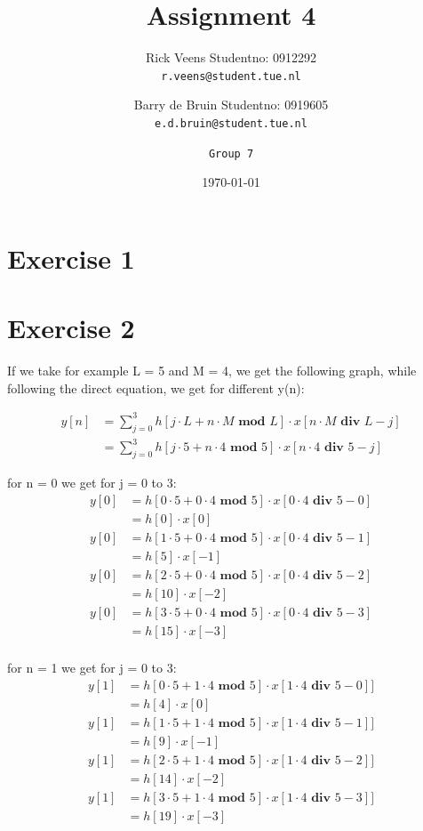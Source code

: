 \documentclass[a4paper,twoside,11pt, fleqn]{article}
\title{\vspace{-\baselineskip}\sffamily\bfseries Assignment 4}
\author{
	Rick Veens \qquad Studentno: 0912292\\
	\texttt{r.veens@student.tue.nl}
	\and
	Barry de Bruin \qquad Studentno: 0919605\\
	\texttt{e.d.bruin@student.tue.nl}
	\and
	\texttt{Group 7}
}
\date{\today}
\begin{document}
\maketitle
\newpage

\tableofcontents

\newpage

\section{Exercise 1}
\section{Exercise 2}
If we take for example L = 5 and M = 4, we get the following graph, while following the direct equation, we get for different y(n):

\begin{align}
y[n] &= \sum_{j=0}^3 h[j\cdot L + n\cdot M \textbf{ mod } L]\cdot x[n\cdot M \textbf{ div } L - j]\\
&= \sum_{j=0}^3 h[j\cdot 5 + n\cdot 4 \textbf{ mod } 5]\cdot x[n\cdot 4 \textbf{ div } 5 - j]
\end{align}


for n = 0 we get for j = 0 to 3:
\begin{align}
y[0] &= h[0\cdot 5 + 0\cdot 4 \textbf{ mod } 5]\cdot x[0\cdot 4 \textbf{ div } 5 - 0]\\ 
&= h[0]\cdot x[0] \\
y[0] &= h[1\cdot 5 + 0\cdot 4 \textbf{ mod } 5]\cdot x[0\cdot 4 \textbf{ div } 5 - 1] \\
&= h[5]\cdot x[-1] \\
y[0] &= h[2\cdot 5 + 0\cdot 4 \textbf{ mod } 5]\cdot x[0\cdot 4 \textbf{ div } 5 - 2] \\
&= h[10]\cdot x[-2] \\
y[0] &= h[3\cdot 5 + 0\cdot 4 \textbf{ mod } 5]\cdot x[0\cdot 4 \textbf{ div } 5 - 3] \\
&= h[15]\cdot x[-3] \\
\end{align}

for n = 1 we get for j = 0 to 3:
\begin{align}
y[1] &= h[0\cdot 5 + 1\cdot 4 \textbf{ mod } 5]\cdot x[1\cdot 4 \textbf{ div } 5 - 0]]\\ 
&= h[4]\cdot x[0] \\
y[1] &= h[1\cdot 5 + 1\cdot 4 \textbf{ mod } 5]\cdot x[1\cdot 4 \textbf{ div } 5 - 1]] \\
&= h[9]\cdot x[-1] \\
y[1] &= h[2\cdot 5 + 1\cdot 4 \textbf{ mod } 5]\cdot x[1\cdot 4 \textbf{ div } 5 - 2]] \\
&= h[14]\cdot x[-2] \\
y[1] &= h[3\cdot 5 + 1\cdot 4 \textbf{ mod } 5]\cdot x[1\cdot 4 \textbf{ div } 5 - 3]] \\
&= h[19]\cdot x[-3] \\
\end{align}
\end{document}
